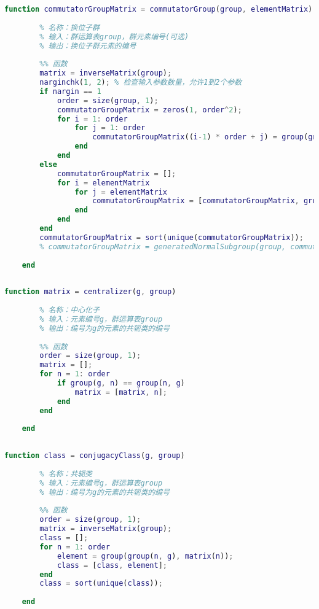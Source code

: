 \begin{lstlisting}[language=Matlab, caption={换位子群}, label={commutatorGroup}]
	function commutatorGroupMatrix = commutatorGroup(group, elementMatrix)
	
	    % 名称：换位子群
	    % 输入：群运算表group，群元素编号(可选)
	    % 输出：换位子群元素的编号
	
	    %% 函数
	    matrix = inverseMatrix(group);
	    narginchk(1, 2); % 检查输入参数数量，允许1到2个参数
	    if nargin == 1
	        order = size(group, 1);
	        commutatorGroupMatrix = zeros(1, order^2);
	        for i = 1: order
	            for j = 1: order
	                commutatorGroupMatrix((i-1) * order + j) = group(group(group(i, j), matrix(i)), matrix(j));
	            end
	        end
	    else
	        commutatorGroupMatrix = [];
	        for i = elementMatrix
	            for j = elementMatrix
	                commutatorGroupMatrix = [commutatorGroupMatrix, group(group(group(i, j), matrix(i)), matrix(j))];
	            end
	        end
	    end
	    commutatorGroupMatrix = sort(unique(commutatorGroupMatrix));
	    % commutatorGroupMatrix = generatedNormalSubgroup(group, commutatorGroupMatrix);
	
	end
	
\end{lstlisting}

\begin{lstlisting}[language=Matlab, caption={中心化子}, label={centralizer}]
	function matrix = centralizer(g, group)
	
	    % 名称：中心化子
	    % 输入：元素编号g，群运算表group
	    % 输出：编号为g的元素的共轭类的编号
	
	    %% 函数
	    order = size(group, 1);
	    matrix = [];
	    for n = 1: order
	        if group(g, n) == group(n, g)
	            matrix = [matrix, n];
	        end
	    end
	
	end
	
\end{lstlisting}

\begin{lstlisting}[language=Matlab, caption={共轭类}, label={conjugacyClass}]
	function class = conjugacyClass(g, group)
	
	    % 名称：共轭类
	    % 输入：元素编号g，群运算表group
	    % 输出：编号为g的元素的共轭类的编号
	
	    %% 函数
	    order = size(group, 1);
	    matrix = inverseMatrix(group);
	    class = [];
	    for n = 1: order
	        element = group(group(n, g), matrix(n));
	        class = [class, element];
	    end
	    class = sort(unique(class));
	
	end
	
\end{lstlisting}

